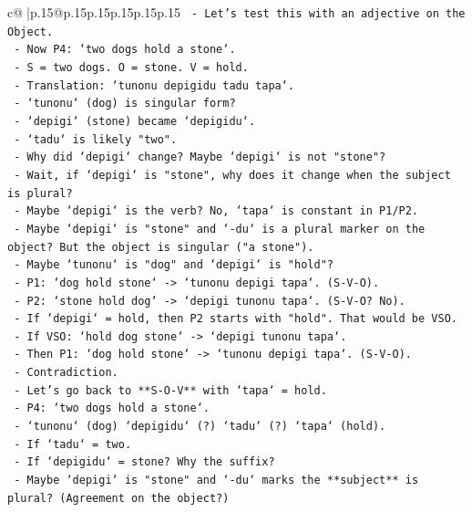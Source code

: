 \documentclass{article}
\begin{document}
{\begin{supertabular}{c@{$\;$}|p{.15\linewidth}@{}p{.15\linewidth}p{.15\linewidth}p{.15\linewidth}p{.15\linewidth}p{.15\linewidth}}
{{{\texttt{     {-} Let's test this with an adjective on the Object.} \\
\texttt{   {-} Now P4: `two dogs hold a stone`.} \\
\texttt{     {-} S = two dogs. O = stone. V = hold.} \\
\texttt{     {-} Translation: `tunonu depigidu tadu tapa`.} \\
\texttt{     {-} `tunonu` (dog) is singular form?} \\
\texttt{     {-} `depigi` (stone) became `depigidu`.} \\
\texttt{     {-} `tadu` is likely "two".} \\
\texttt{     {-} Why did `depigi` change? Maybe `depigi` is not "stone"?} \\
\texttt{     {-} Wait, if `depigi` is "stone", why does it change when the subject is plural?} \\
\texttt{     {-} Maybe `depigi` is the verb? No, `tapa` is constant in P1/P2.} \\
\texttt{     {-} Maybe `depigi` is "stone" and `{-}du` is a plural marker on the object? But the object is singular ("a stone").} \\
\texttt{     {-} Maybe `tunonu` is "dog" and `depigi` is "hold"?} \\
\texttt{       {-} P1: `dog hold stone` {-}> `tunonu depigi tapa`. (S{-}V{-}O).} \\
\texttt{       {-} P2: `stone hold dog` {-}> `depigi tunonu tapa`. (S{-}V{-}O? No).} \\
\texttt{       {-} If `depigi` = hold, then P2 starts with "hold". That would be VSO.} \\
\texttt{       {-} If VSO: `hold dog stone` {-}> `depigi tunonu tapa`.} \\
\texttt{       {-} Then P1: `dog hold stone` {-}> `tunonu depigi tapa`. (S{-}V{-}O).} \\
\texttt{       {-} Contradiction.} \\
\texttt{     {-} Let's go back to **S{-}O{-}V** with `tapa` = hold.} \\
\texttt{       {-} P4: `two dogs hold a stone`.} \\
\texttt{       {-} `tunonu` (dog) `depigidu` (?) `tadu` (?) `tapa` (hold).} \\
\texttt{       {-} If `tadu` = two.} \\
\texttt{       {-} If `depigidu` = stone? Why the suffix?} \\
\texttt{       {-} Maybe `depigi` is "stone" and `{-}du` marks the **subject** is plural? (Agreement on the object?)} \\
}}}
\end{supertabular}}
\end{document}
